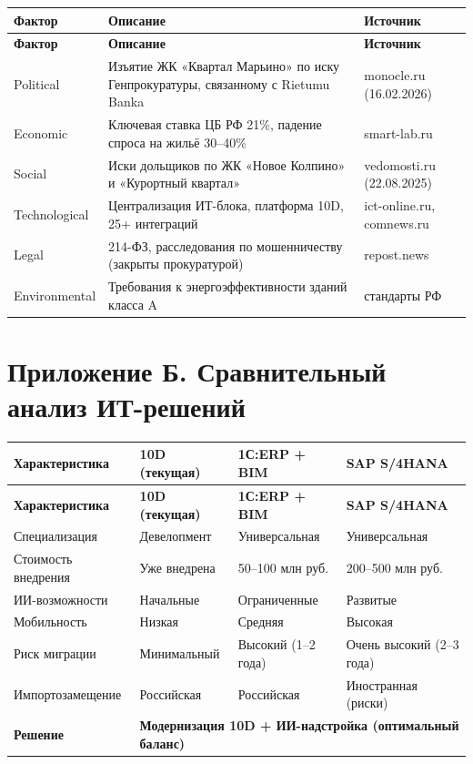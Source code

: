 \documentclass[12pt,a4paper]{article}
\begin{document}
\begin{longtable}{|p{25mm}|p{55mm}|p{60mm}|}
\hline
\rowcolor{samoletlight}
\textbf{Фактор} & \textbf{Описание} & \textbf{Источник} \\
\hline
\endfirsthead
\hline
\rowcolor{samoletlight}
\textbf{Фактор} & \textbf{Описание} & \textbf{Источник} \\
\hline
\endhead
Political & Изъятие ЖК «Квартал Марьино» по иску Генпрокуратуры, связанному с Rietumu Banka & monocle.ru (16.02.2026) \\
\hline
Economic & Ключевая ставка ЦБ РФ 21\%, падение спроса на жильё 30--40\% & smart-lab.ru \\
\hline
Social & Иски дольщиков по ЖК «Новое Колпино» и «Курортный квартал» & vedomosti.ru (22.08.2025) \\
\hline
Technological & Централизация ИТ-блока, платформа 10D, 25+ интеграций & ict-online.ru, comnews.ru \\
\hline
Legal & 214-ФЗ, расследования по мошенничеству (закрыты прокуратурой) & repost.news \\
\hline
Environmental & Требования к энергоэффективности зданий класса A & стандарты РФ \\
\hline
\end{longtable}

\section{Приложение Б. Сравнительный анализ ИТ-решений}

\begin{longtable}{|p{30mm}|p{35mm}|p{35mm}|p{35mm}|}
\hline
\rowcolor{samoletlight}
\textbf{Характеристика} & \textbf{10D (текущая)} & \textbf{1С:ERP + BIM} & \textbf{SAP S/4HANA} \\
\hline
\endfirsthead
\hline
\rowcolor{samoletlight}
\textbf{Характеристика} & \textbf{10D (текущая)} & \textbf{1С:ERP + BIM} & \textbf{SAP S/4HANA} \\
\hline
\endhead
Специализация & Девелопмент & Универсальная & Универсальная \\
\hline
Стоимость внедрения & Уже внедрена & 50--100 млн руб. & 200--500 млн руб. \\
\hline
ИИ-возможности & Начальные & Ограниченные & Развитые \\
\hline
Мобильность & Низкая & Средняя & Высокая \\
\hline
Риск миграции & Минимальный & Высокий (1--2 года) & Очень высокий (2--3 года) \\
\hline
Импортозамещение & Российская & Российская & Иностранная (риски) \\
\hline
\textbf{Решение} & \multicolumn{3}{l|}{\textbf{Модернизация 10D + ИИ-надстройка (оптимальный баланс)} } \\
\hline
\end{longtable}
\end{document}
